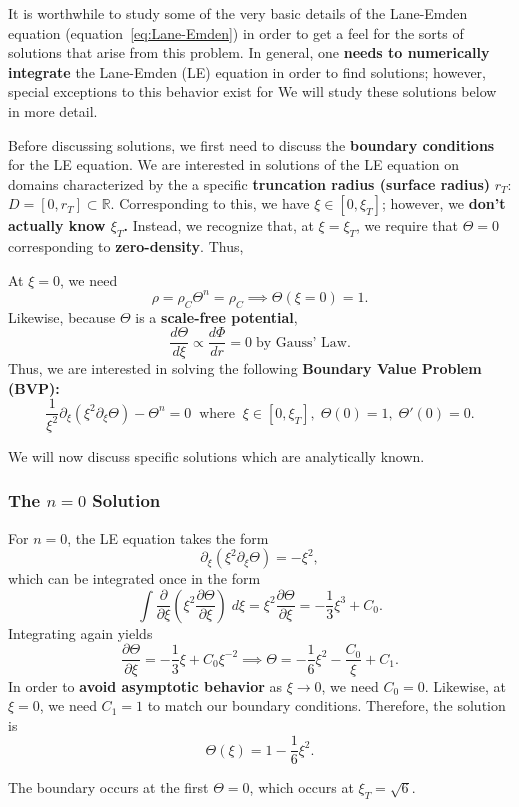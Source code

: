 It is worthwhile to study some of the very basic details of the Lane-Emden equation (equation~\ref{eq:Lane-Emden}) in order to get a feel for the sorts of solutions that arise from this problem. In general, one \textbf{needs to numerically integrate} the Lane-Emden (LE) equation in order to find solutions; however, special exceptions to this behavior exist for  We will study these solutions below in more detail.
\par
Before discussing solutions, we first need to discuss the \textbf{boundary conditions} for the LE equation. We are interested in solutions of the LE equation on domains characterized by the a specific \textbf{truncation radius (surface radius)} $r_T$: $D = [0,r_T] \subset \mathbb{R}$. Corresponding to this, we have $\xi \in [0,\xi_T]$; however, we \textbf{don't actually know $\xi_T$.} Instead, we recognize that, at $\xi = \xi_T$, we require that $\Theta = 0$ corresponding to \textbf{zero-density}. Thus, 
\par
At $\xi = 0$, we need 
\[
\rho = \rho_C \Theta^n = \rho_C \implies \Theta(\xi = 0) = 1.
\]
Likewise, because $\Theta$ is a \textbf{scale-free potential}, 
\[
\frac{d\Theta}{d\xi} \propto \frac{d\Phi}{dr} = 0\;\text{by Gauss' Law.}
\]
Thus, we are interested in solving the following \textbf{Boundary Value Problem (BVP):}
\begin{equation}
\boxed{
    \frac{1}{\xi^2}\partial_\xi\left(\xi^2 \partial_\xi \Theta\right)  - \Theta^n = 0\;\; \text{where}\;\;\xi \in [0, \xi_T],\; \Theta(0) = 1,\; \Theta'(0) = 0.}
\end{equation}

We will now discuss specific solutions which are analytically known.

\subsubsection{The $n=0$ Solution}

For $n=0$, the LE equation takes the form
\begin{equation}
    \partial_\xi \left(\xi^2 \partial_\xi \Theta\right) = - \xi^2,
\end{equation}
which can be integrated once in the form
\[
\int \frac{\partial}{\partial \xi}\left(\xi^2 \frac{\partial \Theta}{\partial \xi}\right) \;d\xi = \xi^2 \frac{\partial \Theta}{\partial \xi} = - \frac{1}{3}\xi^3 + C_0.
\]
Integrating again yields
\[
\frac{\partial \Theta}{\partial \xi} =-\frac{1}{3} \xi + C_0\xi^{-2} \implies \Theta = -\frac{1}{6}\xi^2 - \frac{C_0}{\xi} + C_1.
\]
In order to \textbf{avoid asymptotic behavior} as $\xi \to 0$, we need $C_0 = 0$. Likewise, at $\xi = 0$, we need $C_1 = 1$ to match our boundary conditions. Therefore,
the solution is
\begin{equation}
\label{eq:solution_n1_le}
    \boxed{
    \Theta(\xi) = 1 - \frac{1}{6}\xi^2.
    }
\end{equation}
\par
The boundary occurs at the first $\Theta = 0$, which occurs at $\xi_T = \sqrt{6}$. 

